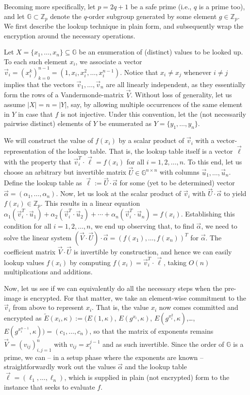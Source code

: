\documentclass{llncs}
\newcommand{\G}{\mathds{G}}
\newcommand{\Z}{\mathds{Z}}
\newcommand{\set}[1]{\{#1\}}
\newcommand{\abs}[1]{\left|#1\right|}
\begin{document}
Becoming more specifically, let $p=2q+1$ be a safe prime (i.e., $q$ is a
prime too), and let $\G\subset\Z_p$ denote the $q$-order subgroup generated
by some element $g\in\Z_p$. We first describe the lookup technique in plain
form, and subsequently wrap the encryption around the necessary operations.

Let $X=\set{x_1,\ldots,x_n}\subseteq\G$ be an enumeration of (distinct)
values to be looked up. To each such element $x_i$, we associate a vector
$\vec v_i = (x_i^k)_{k=0}^{n-1}=(1,x_i,x_i^2,\ldots,x_i^{n-1})$. Notice that
$x_i\neq x_j$ whenever $i\neq j$ implies that the vectors $\vec
v_1,\ldots,\vec v_n$ are all linearly independent, as they essentially form
the rows of a Vandermonde-matrix $\vec V$. Without loss of generality, let us
assume $\abs{X}=n=\abs{Y}$, say, by allowing multiple occurrences of the same
element in $Y$ in case that $f$ is not injective. Under this convention, let
the (not necessarily pairwise distinct) elements of $Y$ be enumerated as
$Y=\set{y_1,\ldots,y_n}$.

We will construct the value of $f(x_i)$ by a scalar product of $\vec v_i$
with a vector-representation of the lookup table. That is, the lookup table
itself is a vector $\vec \ell$ with the property that $\vec v_i^T\cdot\vec
\ell=f(x_i)$ for all $i=1,2,\ldots,n$. To this end, let us choose an
arbitrary but invertible matrix $\vec U\in\G^{n\times n}$ with columns $\vec
u_1,\ldots,\vec u_n$. Define the lookup table as $\vec \ell:=\vec
U\cdot\vec\alpha$ for some (yet to be determined) vector $\vec
\alpha=(\alpha_1,\ldots,\alpha_n)$. Now, let us look at the scalar product of
$\vec v_i$ with $\vec U\cdot \vec\alpha$ to yield $f(x_i)\in\Z_p$. This
results in a linear equation $\alpha_1(\vec v_i^T\cdot \vec
u_1)+\alpha_2(\vec v_i^T\cdot \vec u_2)+\cdots+\alpha_n(\vec v_i^T\cdot\vec
u_n)=f(x_i)$. Establishing this condition for all $i=1,2,\ldots,n$, we end up
observing that, to find $\vec \alpha$, we need to solve the linear system
$(\vec V\cdot\vec U)\cdot\vec\alpha=(f(x_1),\ldots,f(x_n))^T$ for $\vec
\alpha$. The coefficient matrix $\vec V\cdot\vec U$ is invertible by
construction, and hence we can easily lookup values $f(x_i)$ by computing
$f(x_i)=\vec v_i^T\cdot\vec\ell$, taking $O(n)$ multiplications and
additions.

Now, let us see if we can equivalently do all the necessary steps when the
pre-image is encrypted. For that matter, we take an element-wise commitment
to the $\vec v_i$ from above to represent $x_i$. That is, the value $x_i$ now
comes committed and encrypted as $\tilde E(x_i,\kappa):=(E(1,\kappa)$,
$E(g^{x_i},\kappa)$, $E(g^{x_i^2},\kappa)$,\ldots,
$E(g^{x_i^{n-1}},\kappa))=(c_1,\ldots,c_n)$, so that the matrix of exponents
remains $\vec V=(v_{ij})_{i,j=1}^n$ with $v_{ij}=x_i^{j-1}$ and as such
invertible. Since the order of $\G$ is a prime, we can -- in a setup phase
where the exponents are known -- straightforwardly work out the values
$\vec\alpha$ and the lookup table $\vec \ell=(\ell_1,\ldots,\ell_n)$, which
is supplied in plain (not encrypted) form to the instance that seeks to
evaluate $f$.
\end{document}
